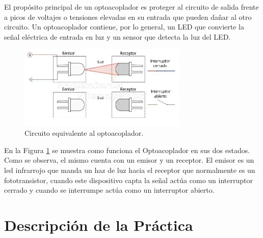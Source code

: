\documentclass[a4paper]{article}
\begin{document}
El propósito principal de un optoacoplador es proteger al circuito 
de salida frente a picos de voltajes o tensiones elevadas en su 
entrada que pueden dañar al otro circuito. Un optoacoplador 
contiene, por lo general, un LED que convierte la señal eléctrica 
de entrada en luz y un sensor que detecta la luz del LED.

\begin{figure}[h]\centering
    \includegraphics[height=4cm]{Optoacoplador.png}
    \caption{Circuito equivalente al optoacoplador.}
    \label{fig:Optoacoplador}
\end{figure}

En la Figura \ref{fig:Optoacoplador} se muestra como funciona el 
Optoacoplador en sus dos estados. Como se observa, el mismo 
cuenta con un emisor y un receptor. El emisor es 
un led infrarrojo que manda un haz de luz hacia el receptor que 
normalmente es un fototransistor, cuando este dispositivo capta 
la señal actúa como un interruptor cerrado y cuando se interrumpe 
actúa como un interruptor abierto.

\section{Descripción de la Práctica}
\end{document}
